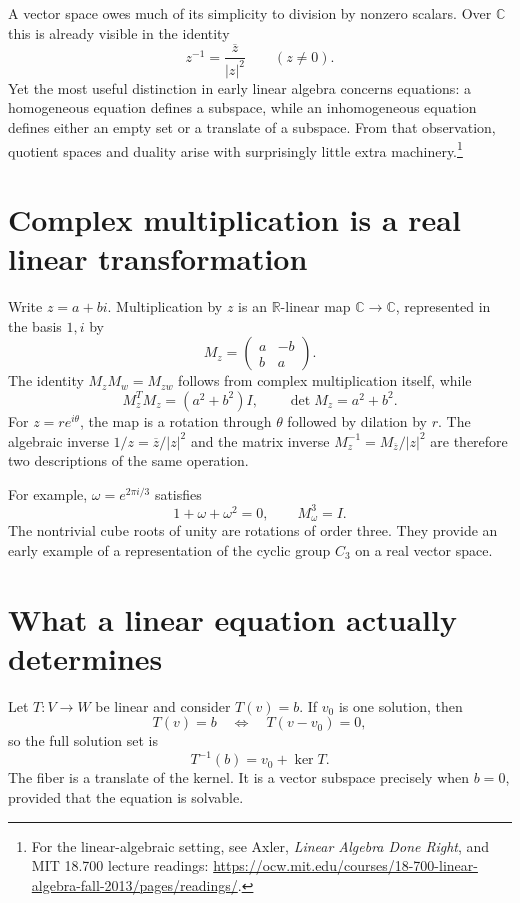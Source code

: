 
A vector space owes much of its simplicity to division by nonzero scalars. Over \(\mathbb C\) this is already visible in the identity
\[
 z^{-1}=\frac{\overline z}{|z|^2}\qquad(z\ne0).
\]
Yet the most useful distinction in early linear algebra concerns equations: a homogeneous equation defines a subspace, while an inhomogeneous equation defines either an empty set or a translate of a subspace. From that observation, quotient spaces and duality arise with surprisingly little extra machinery.\footnote{For the linear-algebraic setting, see Axler, \emph{Linear Algebra Done Right}, and MIT 18.700 lecture readings: \url{https://ocw.mit.edu/courses/18-700-linear-algebra-fall-2013/pages/readings/}.}

\section{Complex multiplication is a real linear transformation}

Write \(z=a+bi\). Multiplication by \(z\) is an \(\mathbb R\)-linear map \(\mathbb C\to\mathbb C\), represented in the basis \(1,i\) by
\[
 M_z=\begin{pmatrix}a&-b\\b&a\end{pmatrix}.
\]
The identity \(M_zM_w=M_{zw}\) follows from complex multiplication itself, while
\[
 M_z^TM_z=(a^2+b^2)I,\qquad \det M_z=a^2+b^2.
\]
For \(z=re^{i\theta}\), the map is a rotation through \(\theta\) followed by dilation by \(r\). The algebraic inverse \(1/z=\overline z/|z|^2\) and the matrix inverse \(M_z^{-1}=M_{\overline z}/|z|^2\) are therefore two descriptions of the same operation.

For example, \(\omega=e^{2\pi i/3}\) satisfies
\[
 1+\omega+\omega^2=0,\qquad M_\omega^3=I.
\]
The nontrivial cube roots of unity are rotations of order three. They provide an early example of a representation of the cyclic group \(C_3\) on a real vector space.

\section{What a linear equation actually determines}

Let \(T:V\to W\) be linear and consider \(T(v)=b\). If \(v_0\) is one solution, then
\[
 T(v)=b\quad\Longleftrightarrow\quad T(v-v_0)=0,
\]
so the full solution set is
\[
 \boxed{T^{-1}(b)=v_0+\ker T.}
\]
The fiber is a translate of the kernel. It is a vector subspace precisely when \(b=0\), provided that the equation is solvable.

